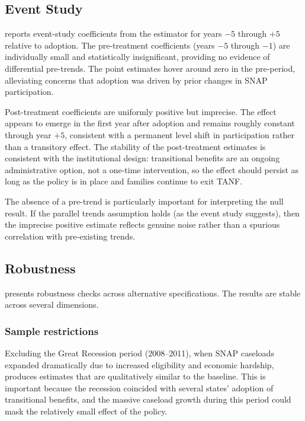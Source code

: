 \documentclass[12pt]{article}
\begin{document}
\subsection{Event Study}



 reports event-study coefficients from the \citet{callaway2021difference} estimator for years $-5$ through $+5$ relative to adoption. The pre-treatment coefficients (years $-5$ through $-1$) are individually small and statistically insignificant, providing no evidence of differential pre-trends. The point estimates hover around zero in the pre-period, alleviating concerns that adoption was driven by prior changes in SNAP participation.

Post-treatment coefficients are uniformly positive but imprecise. The effect appears to emerge in the first year after adoption and remains roughly constant through year $+5$, consistent with a permanent level shift in participation rather than a transitory effect. The stability of the post-treatment estimates is consistent with the institutional design: transitional benefits are an ongoing administrative option, not a one-time intervention, so the effect should persist as long as the policy is in place and families continue to exit TANF.

The absence of a pre-trend is particularly important for interpreting the null result. If the parallel trends assumption holds (as the event study suggests), then the imprecise positive estimate reflects genuine noise rather than a spurious correlation with pre-existing trends.

\subsection{Robustness}



 presents robustness checks across alternative specifications. The results are stable across several dimensions.

\subsubsection*{Sample restrictions} Excluding the Great Recession period (2008--2011), when SNAP caseloads expanded dramatically due to increased eligibility and economic hardship, produces estimates that are qualitatively similar to the baseline. This is important because the recession coincided with several states' adoption of transitional benefits, and the massive caseload growth during this period could mask the relatively small effect of the policy.
\end{document}

